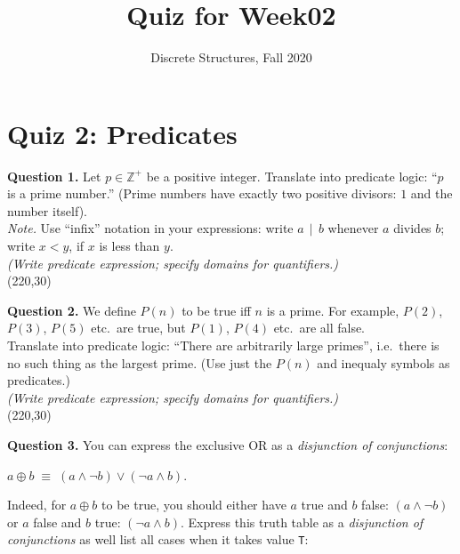 \documentclass[jou]{apa6}
\title{Quiz for Week02}
\author{Discrete Structures, Fall 2020}
\affiliation{RBS}
\begin{document}

\twocolumn

\section{Quiz 2: Predicates}


\vspace{6pt}
{\bf Question 1.} Let $p \in \mathbb{Z}^{+}$ be a positive integer.
Translate into predicate logic: ``$p$ is a prime number.'' (Prime numbers
have exactly two positive divisors: $1$ and the number itself).\\
{\em Note.} Use ``infix'' notation in your expressions: write 
$a\,\mid\,b$ whenever $a$ divides $b$; write $x < y$, if $x$ is less than $y$.\\
{\scriptsize \em (Write predicate expression; specify domains for quantifiers.)}\\
\framebox(220,30){}


{\bf Question 2.} We define $P(n)$ to be true
iff $n$ is a prime. For example, 
$P(2)$, $P(3)$, $P(5)$ etc.\ are true,
but $P(1)$, $P(4)$ etc.\ are all false.\\
Translate into predicate logic: ``There are arbitrarily large primes'', i.e.\ there is no 
such thing as the largest prime.
(Use just the $P(n)$ and inequaly symbols as predicates.)\\
{\scriptsize \em (Write predicate expression; specify domains for quantifiers.)}\\
\framebox(220,30){}


{\bf Question 3.} You can express the exclusive OR as a {\em disjunction of conjunctions}:
\begin{center}
$a \oplus b \;\equiv\; (a \wedge \neg b) \vee (\neg a \wedge b)$.
\end{center}
Indeed, for $a \oplus b$ to be true, you should 
either have $a$ true and $b$ false: $(a \wedge \neg b)$ or 
$a$ false and $b$ true: $(\neg a \wedge b)$. 
Express this truth table as a {\em disjunction of conjunctions} as well \textendash{}
list all cases when it takes value {\tt T}:
\end{document}
